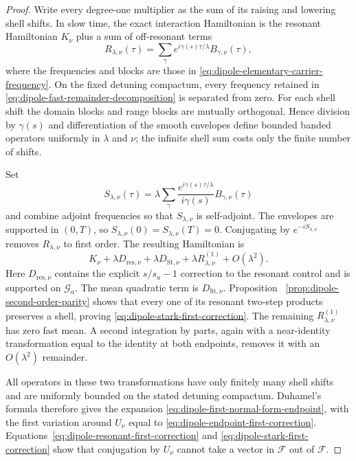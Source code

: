 \documentclass[11pt]{article}
\theoremstyle{remark}
\begin{document}
\begin{proof}
Write every degree-one multiplier as the sum of its raising and lowering
shell shifts.  In slow time, the exact interaction Hamiltonian is the
resonant Hamiltonian $K_\nu$ plus a sum of off-resonant terms
\begin{equation}
 R_{\lambda,\nu}(\tau)
 =\sum_\gamma e^{i\gamma(s)\tau/\lambda}B_{\gamma,\nu}(\tau),
 \label{eq:dipole-fast-remainder-decomposition}
\end{equation}
where the frequencies and blocks are those in
\eqref{eq:dipole-elementary-carrier-frequency}.  On the fixed detuning
compactum, every frequency retained in
\eqref{eq:dipole-fast-remainder-decomposition} is separated from zero.
For each shell shift the domain blocks and range blocks are mutually
orthogonal.  Hence division by $\gamma(s)$ and differentiation of the smooth
envelopes define bounded banded operators uniformly in $\lambda$ and $\nu$;
the infinite shell sum costs only the finite number of shifts.

Set
\[
 S_{\lambda,\nu}(\tau)
 =\lambda\sum_\gamma
 \frac{e^{i\gamma(s)\tau/\lambda}}{i\gamma(s)}
 B_{\gamma,\nu}(\tau)
\]
and combine adjoint frequencies so that $S_{\lambda,\nu}$ is self-adjoint.
The envelopes are supported in $(0,T)$, so
$S_{\lambda,\nu}(0)=S_{\lambda,\nu}(T)=0$.  Conjugating by
$e^{-iS_{\lambda,\nu}}$ removes
$R_{\lambda,\nu}$ to first order.  The resulting Hamiltonian is
\[
 K_\nu
 +\lambda D_{\mathrm{res},\nu}
 +\lambda D_{\mathrm{St},\nu}
 +\lambda R^{(1)}_{\lambda,\nu}
 +O(\lambda^2).
\]
Here $D_{\mathrm{res},\nu}$ contains the explicit
$s/s_a-1$ correction to the resonant control and is supported on
$\mathcal G_a$.  The mean quadratic term is
$D_{\mathrm{St},\nu}$.  Proposition
~\ref{prop:dipole-second-order-parity} shows that every one of its resonant
two-step products preserves a shell, proving
\eqref{eq:dipole-stark-first-correction}.  The remaining
$R^{(1)}_{\lambda,\nu}$ has zero fast mean.  A second integration by parts,
again with a near-identity transformation equal to the identity at both
endpoints, removes it with an $O(\lambda^2)$ remainder.

All operators in these two transformations have only finitely many shell
shifts and are uniformly bounded on the stated detuning compactum.  Duhamel's
formula therefore gives the expansion
\eqref{eq:dipole-first-normal-form-endpoint}, with the first variation around
$U_\nu$ equal to \eqref{eq:dipole-endpoint-first-correction}.
Equations~\eqref{eq:dipole-resonant-first-correction} and
\eqref{eq:dipole-stark-first-correction} show that conjugation by $U_\nu$
cannot take a vector in $\mathcal F$ out of $\mathcal F$.
\end{proof}
\end{document}
